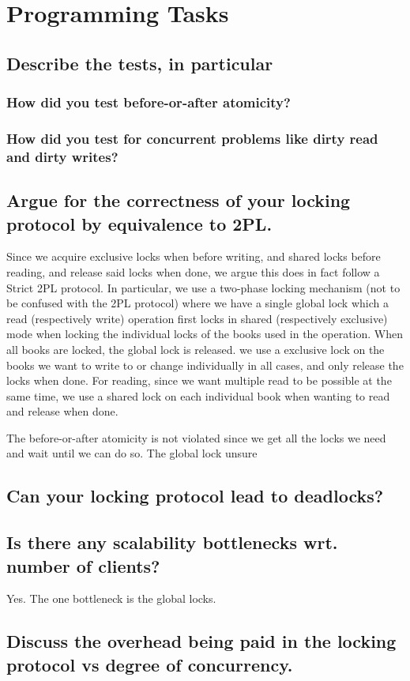 
\section{Programming Tasks}

\subsection{Describe the tests, in particular}

\subsubsection{How did you test before-or-after atomicity?}

\subsubsection{How did you test for concurrent problems like dirty read and dirty writes?}

\subsection{Argue for the correctness of your locking protocol by equivalence to 2PL.}

Since we acquire exclusive locks when before writing, and shared locks before reading, and release said locks when done, we argue this does in fact follow a Strict 2PL protocol. In particular, we use a two-phase locking mechanism (not to be confused with the 2PL protocol) where we have a single global lock which a read (respectively write) operation first locks in shared (respectively exclusive) mode when locking the individual locks of the books used in the operation. When all books are locked, the global lock is released. we use a exclusive lock on the books we want to write to or change individually in all cases, and only release the locks when done. For reading, since we want multiple read to be possible at the same time, we use a shared lock on each individual book when wanting to read and release when done.

The before-or-after atomicity is not violated since we get all the locks we need and wait until we can do so. The global lock unsure

\subsection{Can your locking protocol lead to deadlocks?}

\subsection{Is there any scalability bottlenecks wrt. number of clients?}

Yes. The one bottleneck is the global locks.

\subsection{Discuss the overhead being paid in the locking protocol vs degree of concurrency.}


